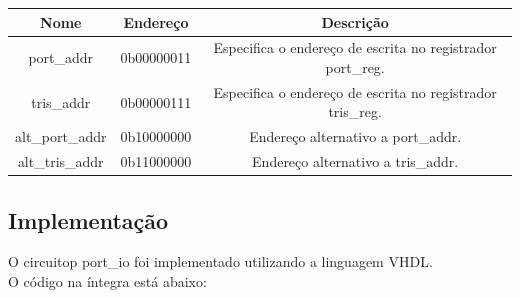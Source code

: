 \documentclass{article}
\begin{document}
\begin{table}[ht]
\begin{center}
\begin{tabular}{|c|c|c|}
    \hline
    Nome & Endereço & Descrição \\
    \hline
    port\_addr & 0b00000011 & Especifica o endereço de escrita no registrador port\_reg. \\
    \hline
    tris\_addr & 0b00000111 & Especifica o endereço de escrita no registrador tris\_reg. \\
    \hline
    alt\_port\_addr & 0b10000000 & Endereço alternativo a port\_addr. \\
    \hline
    alt\_tris\_addr & 0b11000000 & Endereço alternativo a tris\_addr. \\
    \hline
\end{tabular}
\end{center}
\end{table}

\subsection{Implementação}

O circuitop port\_io foi implementado utilizando a linguagem VHDL.\\

O código na íntegra está abaixo:\\
\end{document}
